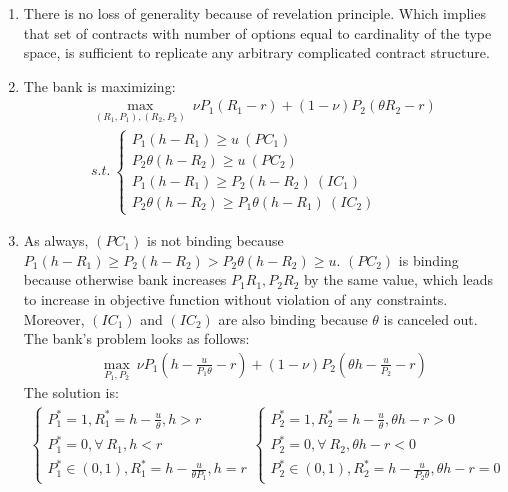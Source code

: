 \documentclass[a4paper]{article}
\begin{document}
\begin{enumerate}
	\item There is no loss of generality because of revelation principle. Which implies that set of contracts with number of options equal to cardinality of the type space, is sufficient to replicate any arbitrary complicated contract structure.
	\item The bank is maximizing:
	\begin{align*}
	\underset{(R_1, P_1), (R_2, P_2)}{\max}\ \nu P_1(R_1 - r) + (1 - \nu)P_2(\theta R_2 - r)\\
	s.t.\ \begin{cases}
	P_1 (h - R_1) \ge u\ (PC_1)\\
	P_2\theta(h - R_2) \ge u\ (PC_2)\\
	P_1(h - R_1) \ge P_2(h - R_2)\ (IC_1)\\
	P_2\theta (h - R_2) \ge P_1 \theta (h - R_1)\ (IC_2)
	\end{cases}
	\end{align*}
	\item As always, $(PC_1)$ is not binding because $P_1(h - R_1) \ge P_2(h - R_2) > P_2 \theta (h - R_2) \ge u$. $(PC_2)$ is binding because otherwise bank increases $P_1R_1, P_2R_2$ by the same value, which leads to increase in objective function without violation of any constraints. Moreover, $(IC_1)$ and $(IC_2)$ are also binding because $\theta$ is canceled out. The bank's problem looks as follows:
	\begin{align*}
	\underset{P_1, P_2}{\max}\ \nu P_1(h - \frac{u}{P_1\theta} - r) + (1 - \nu)P_2(\theta h - \frac{u}{P_2} - r)
	\end{align*} 
	The solution is:
	\begin{align*}
	\begin{cases}
	P_1^* = 1, R_1^* = h - \frac{u}{\theta}, h > r\\
	P_1^* = 0, \forall\ R_1, h < r\\
	P_1^* \in (0, 1), R_1^* = h - \frac{u}{\theta P_1}, h = r
	\end{cases}
	\begin{cases}
	P_2^* = 1, R_2^* = h - \frac{u}{\theta}, \theta h - r > 0\\
	P_2^* = 0, \forall\ R_2, \theta h - r < 0\\
	P_2^* \in (0, 1), R_2^* = h - \frac{u}{P_2 \theta}, \theta h - r = 0 
	\end{cases}
	\end{align*}

\end{enumerate}
\end{document}
